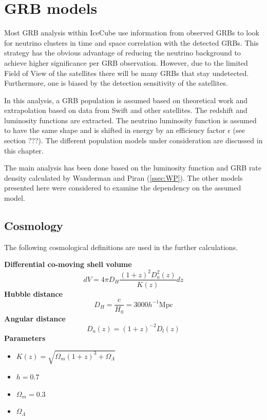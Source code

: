 \section{GRB models}
\label{sec:GRB_models}
Most GRB analysis within IceCube use information from observed GRBs to look
for neutrino clusters in time and space correlation with the detected GRBs.
This strategy has the obvious advantage of reducing the neutrino background to
achieve higher significance per GRB observation. However, due to the limited
Field of View of the satellites there will be many GRBs that stay undetected.
Furthermore, one is biased by the detection sensitivity of the satellites.

In this analysis, a GRB population is assumed based on theoretical work and
extrapolation based on data from Swift and other satellites. The redshift and
luminosity functions are extracted.
The neutrino luminosity function is assumed to have the same shape and is
shifted in energy by an efficiency factor $\epsilon$ (see section ???).
The different population models under consideration are discussed in this
chapter.

The main analysis has been done based on the luminosity function and GRB rate
density calculated by Wanderman and Piran (\ref{ssec:WP}). 
The other models presented here were considered to examine the dependency on
the assumed model.

\subsection{Cosmology}
The following cosmological definitions are used in the further calculations.

\textbf{Differential co-moving shell volume} 
\begin{equation}
dV = 4 \pi D_H \frac{(1+z)^2D_a^2(z)}{K(z)}dz
\end{equation}
\textbf{Hubble distance}
\begin{equation}
 D_H = \frac{c}{H_0} = 3000 h^{-1}\text{Mpc}
\end{equation}
\textbf{Angular distance}
\begin{equation}
 D_a(z) = (1+z)^{-2} D_l(z)
\end{equation}
\textbf{Parameters} 
\begin{itemize}
  \item  $K(z) = \sqrt{\Omega_m (1 + z)^3 + \Omega_{\Lambda}}$
 \item $h=0.7$
 \item $\Omega_m = 0.3$
 \item $\Omega_\Lambda$
\end{itemize}

